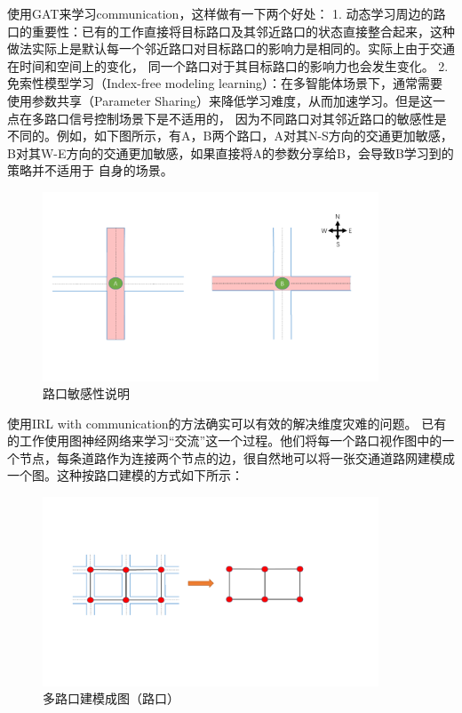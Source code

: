 使用GAT来学习communication，这样做有一下两个好处：
1. 动态学习周边的路口的重要性：已有的工作直接将目标路口及其邻近路口的状态直接整合起来，这种做法实际上是默认每一个邻近路口对目标路口的影响力是相同的。实际上由于交通在时间和空间上的变化，
同一个路口对于其目标路口的影响力也会发生变化。
2. 免索性模型学习（Index-free modeling learning）：在多智能体场景下，通常需要使用参数共享（Parameter Sharing）来降低学习难度，从而加速学习。但是这一点在多路口信号控制场景下是不适用的，
因为不同路口对其邻近路口的敏感性是不同的。例如，如下图所示，有A，B两个路口，A对其N-S方向的交通更加敏感，B对其W-E方向的交通更加敏感，如果直接将A的参数分享给B，会导致B学习到的策略并不适用于
自身的场景。
\begin{figure}[htb]
  \includegraphics[width=10cm]{ppt/index-free.pdf}
  \caption{路口敏感性说明}
  \label{fig:index-free}
\end{figure}

使用IRL with communication的方法确实可以有效的解决维度灾难的问题。
已有的工作使用图神经网络来学习“交流”这一个过程。他们将每一个路口视作图中的一个节点，每条道路作为连接两个节点的边，很自然地可以将一张交通道路网建模成一个图。这种按路口建模的方式如下所示：
\begin{figure}[htb]
  \includegraphics[width=10cm]{ppt/network-graph.pdf}
  \caption{多路口建模成图（路口）}
  \label{fig:network-graph-old}
\end{figure}


